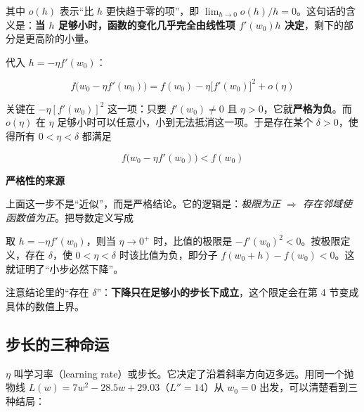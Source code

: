\documentclass[UTF8, a4paper, zihao=-4, fontset=none]{ctexart}
\begin{document}
其中 $o(h)$ 表示“比 $h$ 更快趋于零的项”，即 $\lim_{h\to0}o(h)/h=0$。这句话的含义是：\textbf{当 $h$ 足够小时，函数的变化几乎完全由线性项 $f'(w_0)h$ 决定}，剩下的部分是更高阶的小量。



代入 $h=-\eta f'(w_0)$：


\[
f\big(w_0-\eta f'(w_0)\big)=f(w_0)-\eta\big[f'(w_0)\big]^2+o(\eta)
\]


关键在 $-\eta[f'(w_0)]^2$ 这一项：只要 $f'(w_0)\neq0$ 且 $\eta>0$，它就\textbf{严格为负}。而 $o(\eta)$ 在 $\eta$ 足够小时可以任意小，小到无法抵消这一项。于是存在某个 $\delta>0$，使得所有 $0<\eta<\delta$ 都满足


\[
f\big(w_0-\eta f'(w_0)\big)<f(w_0)
\]


\begin{infobox}
{\bfseries\sffamily\small\color{accent} 严格性的来源}\par\vspace{2pt}
上面这一步不是“近似”，而是严格结论。它的逻辑是：\emph{极限为正 \ensuremath{\Longrightarrow} 存在邻域使函数值为正}。把导数定义写成


取 $h=-\eta f'(w_0)$，则当 $\eta\to0^+$ 时，比值的极限是 $-f'(w_0)^2<0$。按极限定义，存在 $\delta$，使 $0<\eta<\delta$ 时该比值为负，即分子 $f(w_0+h)-f(w_0)<0$。这就证明了“小步必然下降”。


注意结论里的“存在 $\delta$”：\textbf{下降只在足够小的步长下成立}，这个限定会在第 4 节变成具体的数值上界。


\end{infobox}




\subsection{步长的三种命运}



$\eta$ 叫学习率（learning rate）或步长。它决定了沿着斜率方向迈多远。用同一个抛物线 $L(w)=7w^2-28.5w+29.03$（$L''=14$）从 $w_0=0$ 出发，可以清楚看到三种结局：
\end{document}
